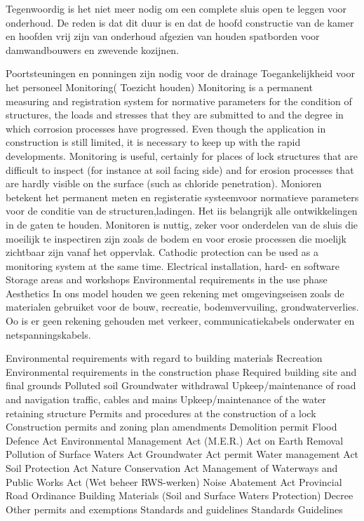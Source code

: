 Tegenwoordig is het niet meer nodig om een complete sluis open te leggen voor onderhoud. De reden is dat dit duur is en dat de hoofd constructie van de kamer en hoofden  vrij zijn van onderhoud afgezien van houden spatborden voor damwandbouwers en zwevende kozijnen.

Poortsteuningen en ponningen zijn nodig voor de drainage
Toegankelijkheid voor het personeel
Monitoring( Toezicht houden)
Monitoring is a permanent measuring and registration system for normative parameters for the condition
of structures, the loads and stresses that they are submitted to and the degree in which corrosion
processes have progressed. Even though the application in construction is still limited, it is necessary to
keep up with the rapid developments. Monitoring is useful, certainly for places of lock structures that are
difficult to inspect (for instance at soil facing side) and for erosion processes that are hardly visible on the
surface (such as chloride penetration).
Monioren betekent het permanent meten en registeratie systeemvoor normatieve parameters voor de conditie van de structuren,ladingen. Het iis belangrijk alle ontwikkelingen in de gaten te houden. Monitoren is nuttig, zeker voor onderdelen van de sluis die moeilijk te inspectiren zijn zoals de bodem en voor erosie processen die moelijk zichtbaar zijn vanaf het oppervlak.
Cathodic protection can be used as a monitoring system at the same time.
Electrical installation, hard- en software
Storage areas and workshops
Environmental requirements in the use phase
Aesthetics
\newline \indent In ons model houden we geen rekening met omgevingseisen zoals de materialen gebruiket voor de bouw, recreatie, bodemvervuiling, grondwaterverlies. Oo is er geen rekening gehouden met verkeer, communicatiekabels onderwater en netspanningskabels.

Environmental requirements with regard to building materials
Recreation
Environmental requirements in the construction phase
Required building site and final grounds
Polluted soil
Groundwater withdrawal
Upkeep/maintenance of road and navigation traffic, cables and mains
Upkeep/maintenance of the water retaining structure
\newline \indent Permits and procedures at the construction of a lock
Construction permits and zoning plan amendments
Demolition permit
Flood Defence Act
Environmental Management Act (M.E.R.)
Act on Earth Removal
Pollution of Surface Waters Act
Groundwater Act permit
Water management Act
Soil Protection Act
Nature Conservation Act
Management of Waterways and Public Works Act (Wet beheer RWS-werken)
Noise Abatement Act
Provincial Road Ordinance
Building Materials (Soil and Surface Waters Protection) Decree
Other permits and exemptions
Standards and guidelines
Standards
Guidelines
